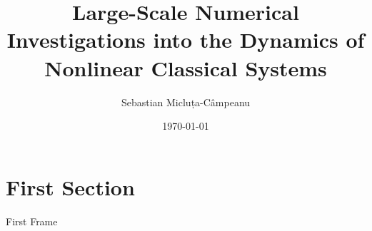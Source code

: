 \documentclass{beamer}
\title{Large-Scale Numerical Investigations into the Dynamics of Nonlinear Classical Systems}
\date{\today}
\author{Sebastian Micluța-Câmpeanu}
\institute{University of Bucharest}
\begin{document}
  \maketitle

  \section{First Section}

  \begin{frame}{First Frame}

  \end{frame}
\end{document}

